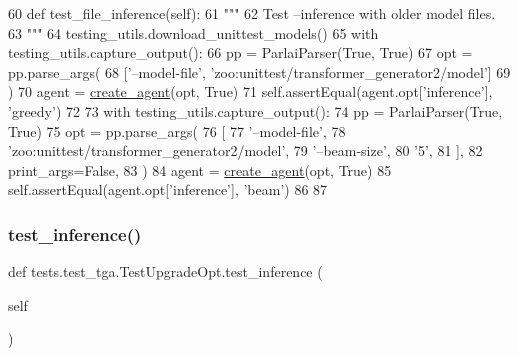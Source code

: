 \begin{DoxyCode}
60     \textcolor{keyword}{def }test\_file\_inference(self):
61         \textcolor{stringliteral}{"""}
62 \textcolor{stringliteral}{        Test --inference with older model files.}
63 \textcolor{stringliteral}{        """}
64         testing\_utils.download\_unittest\_models()
65         with testing\_utils.capture\_output():
66             pp = ParlaiParser(\textcolor{keyword}{True}, \textcolor{keyword}{True})
67             opt = pp.parse\_args(
68                 [\textcolor{stringliteral}{'--model-file'}, \textcolor{stringliteral}{'zoo:unittest/transformer\_generator2/model'}]
69             )
70             agent = \hyperlink{namespaceparlai_1_1core_1_1agents_ad0d54074d4bcc148bb415ab5515a53b5}{create\_agent}(opt, \textcolor{keyword}{True})
71             self.assertEqual(agent.opt[\textcolor{stringliteral}{'inference'}], \textcolor{stringliteral}{'greedy'})
72 
73         with testing\_utils.capture\_output():
74             pp = ParlaiParser(\textcolor{keyword}{True}, \textcolor{keyword}{True})
75             opt = pp.parse\_args(
76                 [
77                     \textcolor{stringliteral}{'--model-file'},
78                     \textcolor{stringliteral}{'zoo:unittest/transformer\_generator2/model'},
79                     \textcolor{stringliteral}{'--beam-size'},
80                     \textcolor{stringliteral}{'5'},
81                 ],
82                 print\_args=\textcolor{keyword}{False},
83             )
84             agent = \hyperlink{namespaceparlai_1_1core_1_1agents_ad0d54074d4bcc148bb415ab5515a53b5}{create\_agent}(opt, \textcolor{keyword}{True})
85             self.assertEqual(agent.opt[\textcolor{stringliteral}{'inference'}], \textcolor{stringliteral}{'beam'})
86 
87 
\end{DoxyCode}
\mbox{\label{classtests_1_1test__tga_1_1TestUpgradeOpt_acaefe84187dab5f848fa33afae999144}} 
\subsubsection{\texorpdfstring{test\+\_\+inference()}{test\_inference()}}
{\footnotesize\ttfamily def tests.\+test\+\_\+tga.\+Test\+Upgrade\+Opt.\+test\+\_\+inference (\begin{DoxyParamCaption}\item[{}]{self }\end{DoxyParamCaption})}

